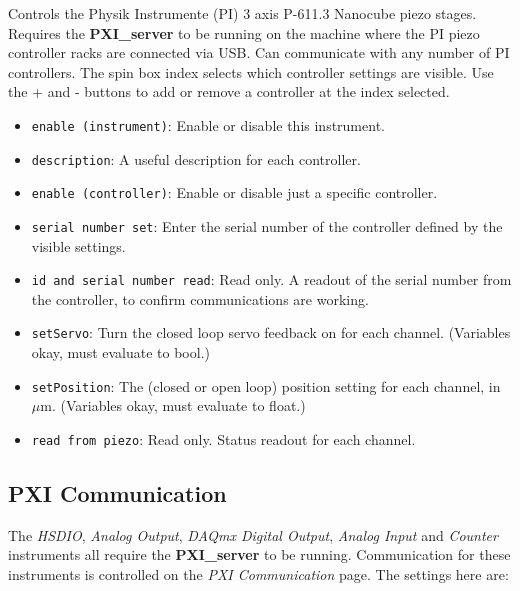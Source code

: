 \documentclass[pdftex,11pt,letterpaper]{article}
\begin{document}
Controls the Physik Instrumente (PI) 3 axis P-611.3 Nanocube piezo stages.  Requires the \textbf{PXI\_server} to be running on the machine where the PI piezo controller racks are connected via USB.  Can communicate with any number of PI controllers.  The spin box index selects which controller settings are visible.  Use the + and - buttons to add or remove a controller at the index selected.

\begin{itemize}
\item \texttt{enable (instrument)}:  Enable or disable this instrument.
\item \texttt{description}:  A useful description for each controller.
\item \texttt{enable (controller)}:  Enable or disable just a specific controller.
\item \texttt{serial number set}:  Enter the serial number of the controller defined by the visible settings.
\item \texttt{id and serial number read}:  Read only.  A readout of the serial number from the controller, to confirm communications are working.
\item \texttt{setServo}:  Turn the closed loop servo feedback on for each channel.  (Variables okay, must evaluate to bool.)
\item \texttt{setPosition}:  The (closed or open loop) position setting for each channel, in $\mu$m.  (Variables okay, must evaluate to float.)
\item \texttt{read from piezo}:  Read only.  Status readout for each channel.
\end{itemize}

\subsection{PXI Communication}

The \textit{HSDIO}, \textit{Analog Output}, \textit{DAQmx Digital Output}, \textit{Analog Input} and \textit{Counter} instruments all require the \textbf{PXI\_server} to be running.  Communication for these instruments is controlled on the \textit{PXI Communication} page.  The settings here are:
\end{document}
